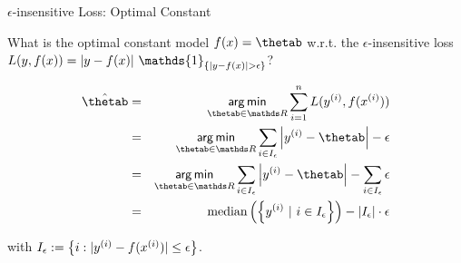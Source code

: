 \begin{vbframe}{$\epsilon$-insensitive Loss: Optimal Constant}

What is the optimal constant model $\fx = \thetab$ w.r.t. the $\epsilon$-insensitive loss $\Lxy =  |y - \fx| ~ \mathds{1}_{ \left\{|y - \fx| > \epsilon \right\}}$?

\vspace{-0.2cm}
\begin{eqnarray*}
\hat \thetab&=& \argmin_{\thetab\in \R}\sumin \Lxyi \\
&=& \argmin_{\thetab\in \R} \sum_{i \in I_\eps} \left| \yi - \thetab \right| - \eps  \\
&=& \argmin_{\thetab\in \R} \sum_{i \in I_\eps} \left| \yi - \thetab \right| - \sum_{i \in I_\eps} \eps \\
&=& \text{median}\left(\left\{\yi ~|~ i \in I_\eps\right\}\right) - |I_\eps| \cdot \eps \\
\end{eqnarray*}

with $I_\epsilon := \left\{i: |y^{(i)} - f(x^{(i)})| \le \epsilon \right\}$.


% 
%   
% 

\end{vbframe}

